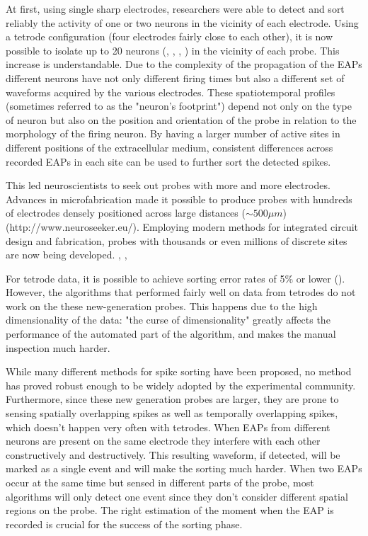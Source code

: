 At first, using single sharp electrodes, researchers were able to detect and sort reliably the activity of one or two neurons in the vicinity of each electrode. Using a tetrode configuration (four electrodes fairly close to each other), it is now possible to isolate up to 20 neurons (\cite{mcnaughton1983stereotrode}, \cite{gray1995tetrodes}, \cite{wilson1993dynamics}, \cite{recce1989tetrode}) in the vicinity of each probe. This increase is understandable. Due to the complexity of the propagation of the EAPs different neurons have not only different firing times but also a different set of waveforms acquired by the various electrodes. These spatiotemporal profiles (sometimes referred to as the "neuron's footprint") depend not only on the type of neuron but also on the position and orientation of the probe in relation to the morphology of the firing neuron. By having a larger number of active sites in different positions of the extracellular medium, consistent differences across recorded EAPs in each site can be used to further sort the detected spikes. 

This led neuroscientists to seek out probes with more and more electrodes. Advances in microfabrication made it possible to produce probes with hundreds of electrodes densely positioned across large distances ($\sim 500 \mu m$) (http://www.neuroseeker.eu/). Employing modern methods for integrated circuit design and fabrication, probes with thousands or even millions of discrete sites are now being developed. \cite{dombovari2014vivo}, \cite{ruther2015new}, \cite{shobe2015brain}

For tetrode data, it is possible to achieve sorting error rates of 5\% or lower (\cite{harris2000accuracy}). However, the algorithms that performed fairly well on data from tetrodes do not work on the these new-generation probes. This happens due to the high dimensionality of the data: "the curse of dimensionality" greatly affects the performance of the automated part of the algorithm, and makes the manual inspection much harder.

While many different methods for spike sorting have been proposed, no method has proved robust enough to be widely adopted by the experimental community. Furthermore, since these new generation probes are larger, they are prone to sensing spatially overlapping spikes as well as temporally overlapping spikes, which doesn't happen very often with tetrodes. When EAPs from different neurons are present on the same electrode they interfere with each other constructively and destructively. This resulting waveform, if detected, will be marked as a single event and will make the sorting much harder. When two EAPs occur at the same time but sensed in different parts of the probe, most algorithms will only detect one event since they don't consider different spatial regions on the probe. The right estimation of the moment when the EAP is recorded is crucial for the success of the sorting phase. 

